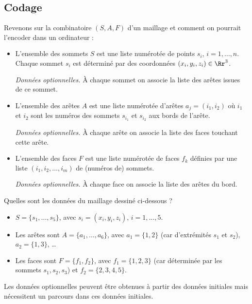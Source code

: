 \documentclass[11pt,class=report,crop=false]{standalone}
\begin{document}


\subsection{Codage}

Revenons sur la combinatoire $(S,A,F)$ d'un maillage et comment on pourrait l'encoder dans un ordinateur :
\begin{itemize}
	\item L'ensemble des sommets $S$ est une liste numérotée de points $s_i$, $i=1,\ldots,n$.
	Chaque sommet $s_i$ est déterminé par des coordonnées $(x_i,y_i,z_i) \in \Rr^3$.
	
	\emph{Données optionnelles.} À chaque sommet on associe la liste des arêtes issues de ce sommet.
	
	\item L'ensemble des arêtes $A$ est une liste numérotée d'arêtes $a_j = (i_1,i_2)$ où
	$i_1$ et $i_2$ sont les numéros des sommets $s_{i_1}$ et $s_{i_2}$ aux bords de l'arête.
	
	\emph{Données optionnelles.} À chaque arête on associe la liste des faces touchant cette arête.
	
	\item L'ensemble des faces $F$ est une liste numérotée de faces $f_k$ définies par une liste $(i_1,i_2,\ldots,i_m)$ de (numéros de) sommets.
	
	\emph{Données optionnelles.} À chaque face on associe la liste des arêtes du bord.
\end{itemize}

\medskip
Quelles sont les données du maillage dessiné ci-dessous ?


\begin{itemize}
	\item $S = \{s_1,\ldots,s_5\}$, avec $s_i=(x_i,y_i,z_i)$, $i=1,\ldots,5$.
	\item Les arêtes sont $A = \{a_1,\ldots,a_6\}$, avec $a_1 = \{1,2\}$ (car d'extrémités $s_1$ et $s_2$), $a_2 = \{1,3\}$, \ldots
	\item Les faces sont $F = \{f_1,f_2\}$, avec $f_1 = \{1,2,3\}$ (car déterminée par les sommets $s_1, s_2, s_3$) et  $f_2 = \{2,3,4,5\}$. 
\end{itemize}

Les données optionnelles peuvent être obtenues à partir des données initiales mais nécessitent un parcours dans ces données initiales.
\end{document}
